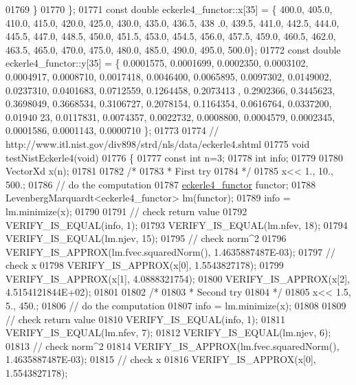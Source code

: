 \begin{DoxyCode}
01769     \}
01770 \};
01771 \textcolor{keyword}{const} \textcolor{keywordtype}{double} eckerle4\_functor::x[35] = \{ 400.0, 405.0, 410.0, 415.0, 420.0, 425.0, 430.0, 435.0, 436.5, 438
      .0, 439.5, 441.0, 442.5, 444.0, 445.5, 447.0, 448.5, 450.0, 451.5, 453.0, 454.5, 456.0, 457.5, 459.0, 460.5,
       462.0, 463.5, 465.0, 470.0, 475.0, 480.0, 485.0, 490.0, 495.0, 500.0\};
01772 \textcolor{keyword}{const} \textcolor{keywordtype}{double} eckerle4\_functor::y[35] = \{ 0.0001575, 0.0001699, 0.0002350, 0.0003102, 0.0004917, 0.0008710, 
      0.0017418, 0.0046400, 0.0065895, 0.0097302, 0.0149002, 0.0237310, 0.0401683, 0.0712559, 0.1264458, 0.2073413
      , 0.2902366, 0.3445623, 0.3698049, 0.3668534, 0.3106727, 0.2078154, 0.1164354, 0.0616764, 0.0337200, 0.01940
      23, 0.0117831, 0.0074357, 0.0022732, 0.0008800, 0.0004579, 0.0002345, 0.0001586, 0.0001143, 0.0000710 \};
01773 
01774 \textcolor{comment}{// http://www.itl.nist.gov/div898/strd/nls/data/eckerle4.shtml}
01775 \textcolor{keywordtype}{void} testNistEckerle4(\textcolor{keywordtype}{void})
01776 \{
01777   \textcolor{keyword}{const} \textcolor{keywordtype}{int} n=3;
01778   \textcolor{keywordtype}{int} info;
01779 
01780   VectorXd x(n);
01781 
01782   \textcolor{comment}{/*}
01783 \textcolor{comment}{   * First try}
01784 \textcolor{comment}{   */}
01785   x<< 1., 10., 500.;
01786   \textcolor{comment}{// do the computation}
01787   \hyperlink{structeckerle4__functor}{eckerle4\_functor} functor;
01788   LevenbergMarquardt<eckerle4\_functor> lm(functor);
01789   info = lm.minimize(x);
01790 
01791   \textcolor{comment}{// check return value}
01792   VERIFY\_IS\_EQUAL(info, 1);
01793   VERIFY\_IS\_EQUAL(lm.nfev, 18);
01794   VERIFY\_IS\_EQUAL(lm.njev, 15);
01795   \textcolor{comment}{// check norm^2}
01796   VERIFY\_IS\_APPROX(lm.fvec.squaredNorm(), 1.4635887487E-03);
01797   \textcolor{comment}{// check x}
01798   VERIFY\_IS\_APPROX(x[0], 1.5543827178);
01799   VERIFY\_IS\_APPROX(x[1], 4.0888321754);
01800   VERIFY\_IS\_APPROX(x[2], 4.5154121844E+02);
01801 
01802   \textcolor{comment}{/*}
01803 \textcolor{comment}{   * Second try}
01804 \textcolor{comment}{   */}
01805   x<< 1.5, 5., 450.;
01806   \textcolor{comment}{// do the computation}
01807   info = lm.minimize(x);
01808 
01809   \textcolor{comment}{// check return value}
01810   VERIFY\_IS\_EQUAL(info, 1);
01811   VERIFY\_IS\_EQUAL(lm.nfev, 7);
01812   VERIFY\_IS\_EQUAL(lm.njev, 6);
01813   \textcolor{comment}{// check norm^2}
01814   VERIFY\_IS\_APPROX(lm.fvec.squaredNorm(), 1.4635887487E-03);
01815   \textcolor{comment}{// check x}
01816   VERIFY\_IS\_APPROX(x[0], 1.5543827178);

\end{DoxyCode}
